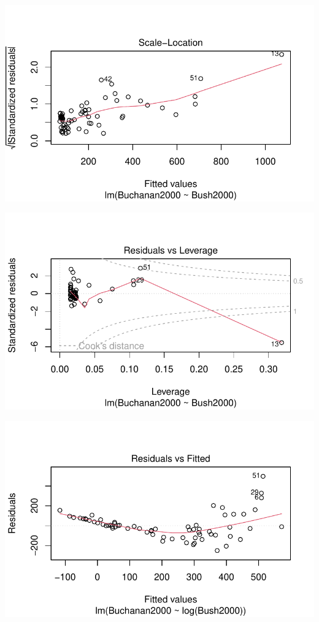 \documentclass[
  letterpaper,
  DIV=11,
  numbers=noendperiod]{scrartcl}
\begin{document}
\includegraphics{case_study_1_files/figure-pdf/unnamed-chunk-6-4.pdf}

\includegraphics{case_study_1_files/figure-pdf/unnamed-chunk-6-5.pdf}

\includegraphics{case_study_1_files/figure-pdf/unnamed-chunk-6-6.pdf}
\end{document}
